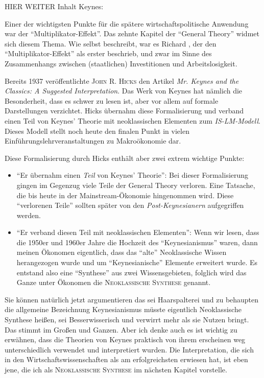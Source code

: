 HIER WEITER
Inhalt Keynes:

Einer der wichtigsten Punkte für die spätere wirtschaftspolitische Anwendung war der "`Multiplikator-Effekt"'. Das zehnte Kapitel der "`General Theory"' widmet sich diesem Thema. Wie \textcite[S. 114]{Keynes1936} selbst beschreibt, war es Richard \textcite{Kahn1931}, der den "`Multiplikator-Effekt"' als erster beschrieb, und zwar im Sinne des Zusammenhangs zwischen (staatlichen) Investitionen und Arbeitslosigkeit.






Bereits 1937 veröffentlichte \textsc{John R. Hicks} den Artikel \textit{Mr. Keynes and the Classics: A Suggested Interpretation}. Das Werk von Keynes hat nämlich die Besonderheit, dass es schwer zu lesen ist, aber vor allem auf formale Darstellungen verzichtet. Hicks übernahm diese Formalisierung und verband einen Teil von Keynes' Theorie mit neoklassischen Elementen zum \textit{IS-LM-Modell}. Dieses Modell stellt noch heute den finalen Punkt in vielen Einführungslehrveranstaltungen zu Makroökonomie dar.

Diese Formalisierung durch Hicks enthält aber zwei extrem wichtige Punkte:
\begin{itemize}
	\item "`Er übernahm einen \textit{Teil} von Keynes' Theorie"': Bei dieser Formalisierung gingen im Gegenzug viele Teile der General Theory verloren. Eine Tatsache, die bis heute in der Mainstream-Ökonomie hingenommen wird. Diese "`verlorenen Teile"' sollten später von den \textit{Post-Keynesianern} aufgegriffen werden.
	\item "`Er verband diesen Teil mit neoklassischen Elementen"': Wenn wir lesen, dass die 1950er und 1960er Jahre die Hochzeit des "`Keynesianismus"' waren, dann meinen Ökonomen eigentlich, dass das "`alte"' Neoklassische Wissen herangezogen wurde und um "`Keynesianische"' Elemente erweitert wurde. Es entstand also eine "`Synthese"' aus zwei Wissensgebieten, folglich wird das Ganze unter Ökonomen die \textsc{Neoklassische Synthese} genannt.
\end{itemize}

Sie können natürlich jetzt argumentieren das sei Haarspalterei und zu behaupten die allgemeine Bezeichnung Keynesianismus müsste eigentlich Neoklassische Synthese heißen, sei Besserwisserisch und verwirrt mehr als sie Nutzen bringt. Das stimmt im Großen und Ganzen. Aber ich denke auch es ist wichtig zu erwähnen, dass die Theorien von Keynes praktisch von ihrem erscheinen weg unterschiedlich verwendet und interpretiert wurden. Die Interpretation, die sich in den Wirtschaftswissenschaften als am erfolgreichsten erwiesen hat, ist eben jene, die ich als \textsc{Neoklassische Synthese} im nächsten Kapitel vorstelle. 



